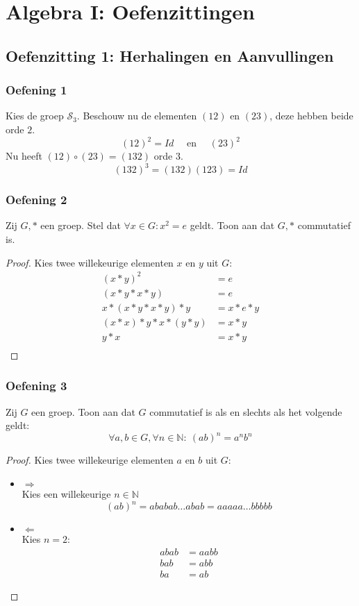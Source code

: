 \documentclass[main.tex]{subfiles}
\begin{document}
\chapter{Algebra I: Oefenzittingen}
\label{cha:algebra-i-oefenzittingen}

\section{Oefenzitting 1: Herhalingen en Aanvullingen}
\subsection*{Oefening 1}
\label{oza:oz1-oef1}
Kies de groep $\mathcal{S}_{3}$.
Beschouw nu de elementen $(12)$ en $(23)$, deze hebben beide orde $2$.
\[ (12)^{2} = Id \quad\text{ en }\quad (23)^{2} \]
Nu heeft $(12) \circ (23) = (132)$ orde $3$.
\[ (132)^{3} = (132)(123) = Id \]

\subsection*{Oefening 2}
\label{oza:oz1-oef2}
Zij $G,*$ een groep.
Stel dat $\forall x \in G: x^{2} = e$ geldt.
Toon aan dat $G,*$ commutatief is.

\begin{proof}
  Kies twee willekeurige elementen $x$ en $y$ uit $G$:
  \[ 
  \begin{array}{rl}
  (x*y)^{2} &= e\\
  (x*y*x*y) &= e\\
  x*(x*y*x*y)*y &= x*e*y\\
  (x*x)*y*x*(y*y) &= x*y\\
  y*x &= x*y\\
  \end{array}
  \]
\end{proof}

\subsection*{Oefening 3}
\label{oza:oz1-oef3}
Zij $G$ een groep.
Toon aan dat $G$ commutatief is als en slechts als het volgende geldt:
\[ \forall a,b \in G, \forall n \in \mathbb{N}:\ (ab)^{n} = a^{n}b^{n} \]

\begin{proof}
  Kies twee willekeurige elementen $a$ en $b$ uit $G$:
  \begin{itemize}
  \item $\Rightarrow$\\
    Kies een willekeurige $n\in \mathbb{N}$
    \[ (ab)^{n} = ababab \ldots abab = aaaaa \ldots bbbbb \]
  \item $\Leftarrow$\\
    Kies $n=2$:
    \[ 
    \begin{array}{rl}
       abab &= aabb\\
       bab &= abb\\
       ba &= ab
    \end{array}
    \]
  \end{itemize}
\end{proof}
\end{document}
